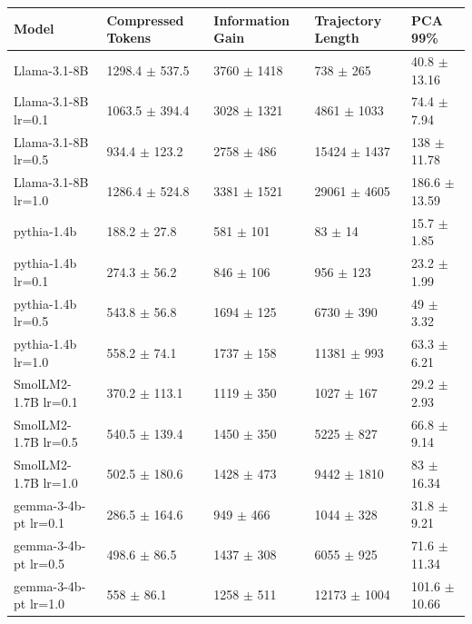\begin{tabular}{lllll}
\toprule
 Model                         & Compressed Tokens           & Information Gain         & Trajectory Length         & PCA 99\%                    \\
\midrule
 Llama-3.1-8B                  & 1298.4 {\small $\pm$ 537.5} & 3760 {\small $\pm$ 1418} & 738 {\small $\pm$ 265}    & 40.8 {\small $\pm$ 13.16}  \\
 Llama-3.1-8B {\small lr=0.1}  & 1063.5 {\small $\pm$ 394.4} & 3028 {\small $\pm$ 1321} & 4861 {\small $\pm$ 1033}  & 74.4 {\small $\pm$ 7.94}   \\
 Llama-3.1-8B {\small lr=0.5}  & 934.4 {\small $\pm$ 123.2}  & 2758 {\small $\pm$ 486}  & 15424 {\small $\pm$ 1437} & 138 {\small $\pm$ 11.78}   \\
 Llama-3.1-8B {\small lr=1.0}  & 1286.4 {\small $\pm$ 524.8} & 3381 {\small $\pm$ 1521} & 29061 {\small $\pm$ 4605} & 186.6 {\small $\pm$ 13.59} \\
 \midrule
 pythia-1.4b                   & 188.2 {\small $\pm$ 27.8}   & 581 {\small $\pm$ 101}   & 83 {\small $\pm$ 14}      & 15.7 {\small $\pm$ 1.85}   \\
 pythia-1.4b {\small lr=0.1}   & 274.3 {\small $\pm$ 56.2}   & 846 {\small $\pm$ 106}   & 956 {\small $\pm$ 123}    & 23.2 {\small $\pm$ 1.99}   \\
 pythia-1.4b {\small lr=0.5}   & 543.8 {\small $\pm$ 56.8}   & 1694 {\small $\pm$ 125}  & 6730 {\small $\pm$ 390}   & 49 {\small $\pm$ 3.32}     \\
 pythia-1.4b {\small lr=1.0}   & 558.2 {\small $\pm$ 74.1}   & 1737 {\small $\pm$ 158}  & 11381 {\small $\pm$ 993}  & 63.3 {\small $\pm$ 6.21}   \\
 \midrule
 SmolLM2-1.7B {\small lr=0.1}  & 370.2 {\small $\pm$ 113.1}  & 1119 {\small $\pm$ 350}  & 1027 {\small $\pm$ 167}   & 29.2 {\small $\pm$ 2.93}   \\
 SmolLM2-1.7B {\small lr=0.5}  & 540.5 {\small $\pm$ 139.4}  & 1450 {\small $\pm$ 350}  & 5225 {\small $\pm$ 827}   & 66.8 {\small $\pm$ 9.14}   \\
 SmolLM2-1.7B {\small lr=1.0}  & 502.5 {\small $\pm$ 180.6}  & 1428 {\small $\pm$ 473}  & 9442 {\small $\pm$ 1810}  & 83 {\small $\pm$ 16.34}    \\
 \midrule
 gemma-3-4b-pt {\small lr=0.1} & 286.5 {\small $\pm$ 164.6}  & 949 {\small $\pm$ 466}   & 1044 {\small $\pm$ 328}   & 31.8 {\small $\pm$ 9.21}   \\
 gemma-3-4b-pt {\small lr=0.5} & 498.6 {\small $\pm$ 86.5}   & 1437 {\small $\pm$ 308}  & 6055 {\small $\pm$ 925}   & 71.6 {\small $\pm$ 11.34}  \\
 gemma-3-4b-pt {\small lr=1.0} & 558 {\small $\pm$ 86.1}     & 1258 {\small $\pm$ 511}  & 12173 {\small $\pm$ 1004} & 101.6 {\small $\pm$ 10.66} \\
\bottomrule
\end{tabular}
